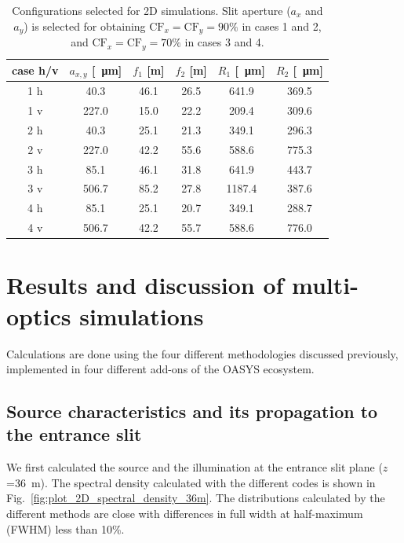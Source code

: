 \documentclass{iucr}              %
\begin{document}
\begin{table}[]
    \label{table:2Dusercases}
    \caption{Configurations selected for 2D simulations. Slit aperture ($a_x$ and $a_y$) is selected for obtaining $\text{CF}_{x}=\text{CF}_{y}=90\%$ in cases 1 and 2, and $\text{CF}_{x}=\text{CF}_{y}=70\%$ in cases 3 and 4. 
    }
    \begin{tabular}{c|c|c|c|c|c}
         case h/v & $a_{x,y}$ [\SI{}{\micro\meter}] & $f_1$ [m] & $f_2$ [m] & $R_1$ [\SI{}{\micro\meter}]& $R_2$ [\SI{}{\micro\meter}] \\
         \hline
1 h &      40.3 & 46.1 &     26.5 &     641.9 &     369.5 
\\
1 v &      227.0 & 15.0 &     22.2 &     209.4 &     309.6 
\\
\hline
2 h &      40.3 & 25.1 &     21.3 &     349.1 &     296.3  
\\
2 v &      227.0 & 42.2 &     55.6 &     588.6 &     775.3 
\\
\hline \hline
3 h &      85.1 & 46.1 &     31.8 &     641.9 &     443.7 
\\
3 v &      506.7 & 85.2 &     27.8 &     1187.4 &     387.6  
\\
\hline
4 h &      85.1 & 25.1 &     20.7 &     349.1 &     288.7 
\\
4 v &      506.7 & 42.2 &     55.7 &     588.6 &     776.0 

    \end{tabular}
\end{table}


\section{Results and discussion of multi-optics simulations}
\label{sec:complete-beamline}

Calculations are done using the four different methodologies discussed previously, implemented in four different add-ons of the OASYS ecosystem. 

\subsection{Source characteristics and its propagation to the entrance slit}
\label{sec:results36m}

We first calculated the source and the illumination at the entrance slit plane ($z$=\SI{36}{\meter}).
The spectral density calculated with the different codes is shown in Fig.~\ref{fig:plot_2D_spectral_density_36m}. The distributions calculated by the different methods are close with differences in full width at half-maximum (FWHM) less than 10\%.
\end{document}
